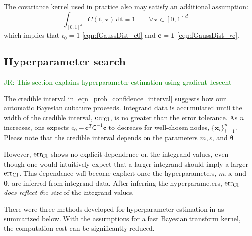 \documentclass{svjour3}                     %
\newcommand{\bm}[1]{\boldsymbol{#1}}
\newcommand{\D}[1]{\text{d}{#1}}
\newcommand{\vtheta}{{\bm{\theta}}}
\newcommand{\vc}{\bm{c}}
\newcommand{\vt}{\bm{t}}
\newcommand{\vx}{\bm{x}}
\newcommand{\vone}{\bm{1}}
\newcommand{\mC}{\mathsf{C}}
\newcommand{\CI}{\textup{CI}}
\newcommand{\err}{\textup{err}}
\newcommand{\JRNote}[1]{{\textcolor{green}{JR: #1}}}
\begin{document}
The covariance kernel used in practice also may satisfy an additional assumption:
\begin{equation} \label{addAssump}
\int_{[0,1]^d} C(\vt,\vx) \, \D \vt = 1 \qquad \forall \vx \in [0,1]^d,
\end{equation}
which implies that $c_{0} = 1$ \eqref{eqn:fGaussDist_c0} and $\vc_{} = \vone$ 	\eqref{eqn:fGaussDist_vc}.  












\subsection{Hyperparameter search}
\JRNote{
	This section explains hyperparameter estimation using gradient descent}


The credible interval in \eqref{eqn_prob_confidence_interval} suggests how our automatic Bayesian cubature proceeds.  Integrand data is accumulated until the width of the credible interval, $\err_{\CI}$, is no greater than the error tolerance.  As $n$ increases, one expects $c_{0} - \vc^T\mC^{-1}\vc$ to decrease for well-chosen nodes, $\{\vx_i\}_{i=1}^n$. Please note that the credible interval depends on the parameters $m, s$, and $\vtheta$

However, $\err_{\CI}$ shows no explicit dependence on the integrand values, even though one would intuitively expect that a larger integrand should imply a larger $\err_{\CI}$. This dependence will become explicit once the hyperparameters, $m, s$, and $\vtheta$,  are inferred from integrand data.
After inferring the hyperparameters, $\err_{\CI}$ \emph{does reflect the size} of the integrand values. 




 

There were three methods developed for hyperparameter estimation in \cite{JagHic19a} as summarized below. With the assumptions for a fast Bayesian transform kernel,
the computation cost can be significantly reduced.
\end{document}
